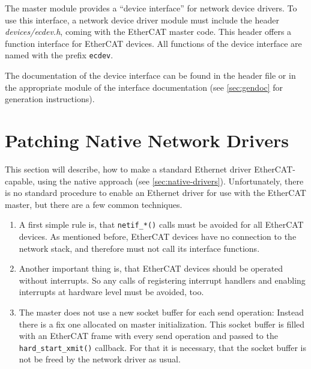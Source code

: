 \documentclass[a4paper,12pt,BCOR6mm,bibtotoc,idxtotoc]{scrbook}
\begin{document}
The master module provides a ``device interface'' for network device drivers.
To use this interface, a network device driver module must include the header
\textit{devices/ecdev.h}, coming with the
EtherCAT master code. This header offers a function interface for EtherCAT
devices. All functions of the device interface are named with the prefix
\lstinline+ecdev+.

The documentation of the device interface can be found in the header file or
in the appropriate module of the interface documentation (see
\autoref{sec:gendoc} for generation instructions).



\section{Patching Native Network Drivers}
\label{sec:patching}

This section will describe, how to make a standard Ethernet driver
EtherCAT-capable, using the native approach (see
\autoref{sec:native-drivers}). Unfortunately, there is no standard procedure
to enable an Ethernet driver for use with the EtherCAT master, but there are a
few common techniques.

\begin{enumerate}

\item A first simple rule is, that \lstinline+netif_*()+ calls must be avoided
for all EtherCAT devices. As mentioned before, EtherCAT devices have no
connection to the network stack, and therefore must not call its interface
functions.

\item Another important thing is, that EtherCAT devices should be operated
without interrupts. So any calls of registering interrupt handlers and enabling
interrupts at hardware level must be avoided, too.

\item The master does not use a new socket buffer for each send operation:
Instead there is a fix one allocated on master initialization. This socket
buffer is filled with an EtherCAT frame with every send operation and passed to
the \lstinline+hard_start_xmit()+ callback. For that it is necessary, that the
socket buffer is not be freed by the network driver as usual.

\end{enumerate}
\end{document}
